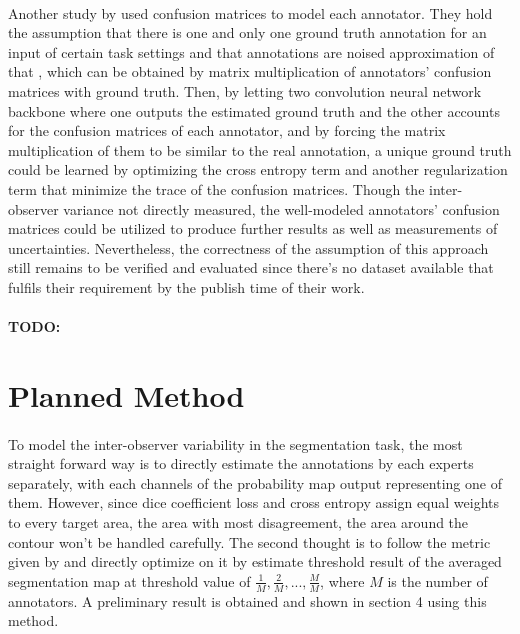 \documentclass[12pt]{extarticle}
\begin{document}
\paragraph{}
Another study by \cite{zhang2020disentangling} used confusion matrices to
model each annotator. They hold the assumption that there is one and
only one ground truth annotation for an input of certain task settings and
that annotations are noised approximation of that
, which can be obtained by matrix multiplication of annotators' 
confusion matrices with ground truth. Then, by letting two convolution neural network backbone
where one outputs the estimated ground truth and the other accounts for the confusion matrices
of each annotator, and by forcing the matrix multiplication of them to be similar to the
real annotation, a unique ground truth could be learned by optimizing the cross entropy term
and another regularization term that minimize the trace of the confusion matrices.
Though the inter-observer variance not directly measured, the well-modeled annotators'
confusion matrices could be utilized to produce further results
as well as measurements of uncertainties.
Nevertheless, the correctness of the assumption of this approach
still remains to be verified and evaluated since there's no dataset available 
that fulfils their requirement by the publish time of their work.
\paragraph{}
\textbf{TODO: }

\section{Planned Method}
\paragraph{}
To model the inter-observer variability in the segmentation task, the most straight forward way is to 
directly estimate the annotations by each experts separately, with each channels of 
the probability map output representing one of them. However, since dice coefficient loss and cross entropy 
assign equal weights to every target area, the area with most disagreement, 
the area around the contour won't be handled carefully\cite{Kervadec_2021}.
The second thought is to follow the metric given by \cite{qubiq} and directly optimize on it by estimate threshold 
result of the averaged segmentation map at threshold value of $\frac{1}{M}, \frac{2}{M}, ..., \frac{M}{M}$, 
where $M$ is the number of annotators. A preliminary result is obtained and shown in section 4 using this method.
\end{document}
